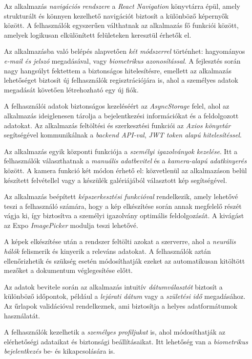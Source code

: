\documentclass[
]{thesis-ekf}
\theoremstyle{definition}
\theoremstyle{remark}
\begin{document}
Az alkalmazás \emph{navigációs rendszere} a \emph{React Navigation} könyvtárra épül, amely strukturált és könnyen kezelhető navigációt biztosít a különböző képernyők között. A felhasználók egyszerűen válthatnak az alkalmazás fő funkciói között, amelyek logikusan elkülönített felületeken keresztül érhetők el.

Az alkalmazásba való belépés alapvetően \emph{két módszerrel} történhet: hagyományos \emph{e-mail és jelszó} megadásával, vagy \emph{biometrikus azonosítással}. A fejlesztés során nagy hangsúlyt fektettem a biztonságos hitelesítésre, emellett az alkalmazás lehetőséget biztosít új felhasználók regisztrációjára is, ahol a személyes adatok megadását követően létrehozható egy új fiók.

A felhasználói adatok biztonságos kezeléséért az \emph{AsyncStorage} felel, ahol az alkalmazás ideiglenesen tárolja a bejelentkezési információkat és a feldolgozott adatokat. Az alkalmazás feltöltési és szerkesztési funkciói az \emph{Axios könyvtár} segítségével kommunikálnak a \emph{backend API-val}, \emph{JWT token alapú hitelesítéssel}.

Az alkalmazás egyik központi funkciója a \emph{személyi igazolványok kezelése}. Itt a felhasználók választhatnak a \emph{manuális adatbevitel} és a \emph{kamera-alapú adatkinyerés} között. A kamera funkció két módon érhető el: közvetlenül az alkalmazáson belül készített felvétellel vagy a készülék galériájából választott kép segítségével.

Az alkalmazás beépített \emph{képszerkesztési funkcióval} rendelkezik, amely lehetővé teszi a felhasználó számára, hogy a kép elkészítése során annak megfelelő részét vágja ki, így biztosítva a személyi igazolvány optimális feldolgozását. A kivágást az Expo \emph{ImagePicker} modulja teszi lehetővé.

A képek elkészítése után a rendszer feltölti azokat a szerverre, ahol a \emph{neurális hálók} felismerik és kinyerik a releváns adatokat. A felhasználók aztán ellenőrizhetik és szükség esetén módosíthatják ezeket az automatikusan kitöltött mezőket a dokumentum véglegesítése előtt.

Az adatok bevitele során az alkalmazás intuitív \emph{dátumválasztót} biztosít a különböző időpontok, például a \emph{lejárati dátum} vagy a \emph{születési idő} megadásához. Az űrlapok validációval rendelkeznek, ami biztosítja a helyes adatformátumok használatát.

A felhasználók kezelhetik a \emph{személyes profiljukat} is, ahol módosíthatják az elérhetőségi adataikat és biztonsági beállításaikat. Itt lehetőség van a \emph{biometrikus bejelentkezés} be- és kikapcsolására is.
\end{document}
